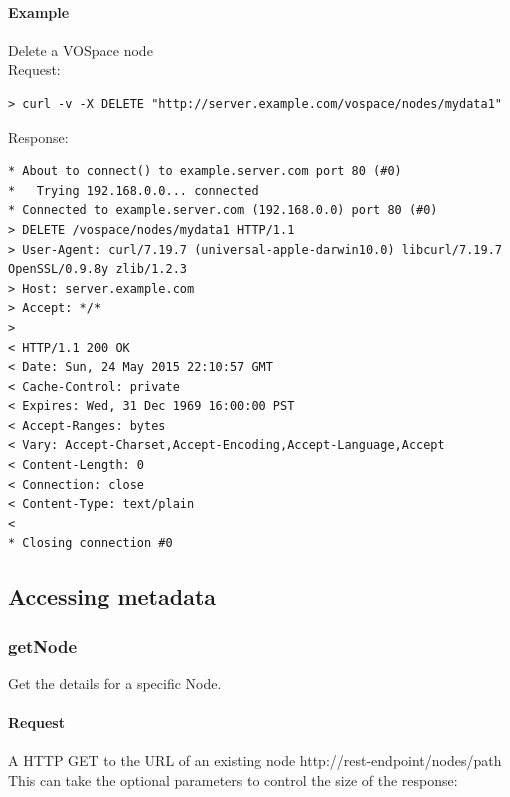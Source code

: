 \documentclass[11pt,a4paper]{ivoa}
\begin{document}
\paragraph{Example}
Delete a VOSpace node
\\[5px]
\noindent
Request:
\begin{lstlisting}
> curl -v -X DELETE "http://server.example.com/vospace/nodes/mydata1"
\end{lstlisting}
Response:
\begin{lstlisting}
* About to connect() to example.server.com port 80 (#0)
*   Trying 192.168.0.0... connected
* Connected to example.server.com (192.168.0.0) port 80 (#0)
> DELETE /vospace/nodes/mydata1 HTTP/1.1
> User-Agent: curl/7.19.7 (universal-apple-darwin10.0) libcurl/7.19.7 OpenSSL/0.9.8y zlib/1.2.3
> Host: server.example.com
> Accept: */*
>
< HTTP/1.1 200 OK
< Date: Sun, 24 May 2015 22:10:57 GMT
< Cache-Control: private
< Expires: Wed, 31 Dec 1969 16:00:00 PST
< Accept-Ranges: bytes
< Vary: Accept-Charset,Accept-Encoding,Accept-Language,Accept
< Content-Length: 0
< Connection: close
< Content-Type: text/plain
<
* Closing connection #0
\end{lstlisting}

\subsection{Accessing metadata}
\label{subsec:accessing metadata}

\subsubsection{getNode}
\label{subsubsec:getnode}
Get the details for a specific Node.

\paragraph{Request}
A HTTP GET to the URL of an existing node http://rest-endpoint/nodes/path
This can take the optional parameters to control the size of the response:
\end{document}
